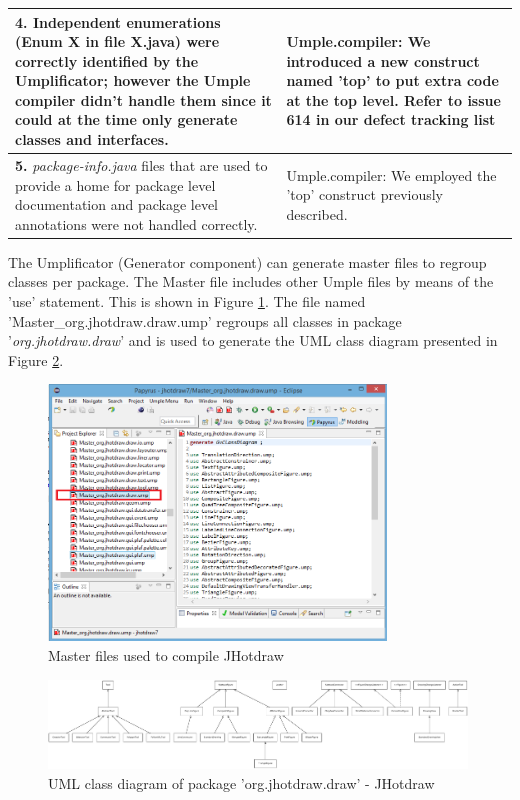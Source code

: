 \begin{table}[htbp]
\begin{tabularx}{\textwidth}{X|X}
\textbf{4.} Independent enumerations (Enum X in file X.java) were correctly identified by the Umplificator; however the Umple compiler didn't handle them since it could at the time only generate classes and interfaces. 
  &  Umple.compiler: We introduced a new construct named 'top' to put extra code at the top level. Refer to issue 614 in our defect tracking list \cite{UmpleIssues} \\ \hline

\textbf{5.} \textit{package-info.java} files that are used to provide a home for package level documentation and package level annotations were not handled correctly.
  &  Umple.compiler: We employed the 'top' construct previously described.    
 \\ \hline
\end{tabularx}
\end{table}

The Umplificator (Generator component) can generate master files to regroup classes per package. The Master file includes other Umple files by means of the 'use' statement. This is shown in Figure \ref{fig:jhotdrawMasterDraw}. The file named 'Master\_org.jhotdraw.draw.ump' regroups all classes in package '\textit{org.jhotdraw.draw}' and is used to generate the UML class diagram presented in Figure  \ref{fig:jhotdrawUMLClass}.

\begin{figure}[h]
\centering
\includegraphics[width=0.80\textwidth]{Figures/jhotdrawMasterDraw.png} 
\caption{Master files used to compile JHotdraw}
\label{fig:jhotdrawMasterDraw}
\end{figure}

\newpage
\begin{figure}
\includegraphics[width=0.99\textwidth]{Figures/jhotdrawuml.pdf} 
\caption{UML class diagram of package 'org.jhotdraw.draw' -  JHotdraw}
\label{fig:jhotdrawUMLClass}
\end{figure}

